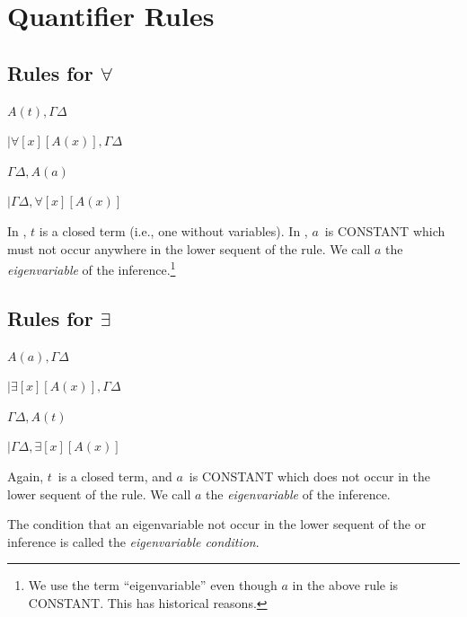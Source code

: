\documentclass[10pt,a4paper]{article}
\newcommand*{\olup}[1]{\MakeUppercase{#1}}
\theoremstyle{plain}
\theoremstyle{definition}
\theoremstyle{remark}
\newcommand*{\olfileid}[3]{}
\newcommand*{\olsection}[1]{\section*{#1}}
\providecommand{\RightLabel}[1]{}
\providecommand{\DisplayProof}{}
\providecommand{\fCenter}{}
\providecommand{\lforall}{\mathord{\forall}}
\providecommand{\lexists}{\mathord{\exists}}
\providecommand{\LeftR}[1]{}
\providecommand{\RightR}[1]{}
\providecommand{\UnaryInf}{\ensuremath{\mid}}
\providecommand{\RightR}{\mathrm{R}}
\providecommand{\LeftR}{\mathrm{L}}
\providecommand{\Axiom}{\mathrm{Ax}}
\begin{document}
\olfileid{fol}{seq}{qrl}

\olsection{Quantifier Rules}

\subsection{Rules for $\lforall$}

\begin{defish}
\Axiom$ A(t), \Gamma \fCenter \Delta$
\RightLabel{\LeftR{\lforall}}
\UnaryInf$ \lforall[x][A(x)],\Gamma \fCenter \Delta$
\DisplayProof
\hfill
\Axiom$ \Gamma \fCenter \Delta, A(a) $
\RightLabel{\RightR{\lforall}}
\UnaryInf$ \Gamma \fCenter \Delta, \lforall[x][A(x)]$
\DisplayProof
\end{defish}

In \LeftR{\lforall}, $t$ is a closed term (i.e., one without
variables). In \RightR{\lforall}, $a$~is \olup{constant} which must not
occur anywhere in the lower sequent of the \RightR{\lforall} rule. We
call $a$ the \emph{eigenvariable} of the \RightR{\forall}
inference.\footnote{We use the term ``eigenvariable'' even though $a$
in the above rule is \olup{constant}. This has historical reasons.}

\subsection{Rules for $\lexists$}

\begin{defish}
\Axiom$ A(a), \Gamma \fCenter \Delta $
\RightLabel{\LeftR{\lexists}}
\UnaryInf$ \lexists[x][A(x)], \Gamma \fCenter \Delta$
\DisplayProof
\hfill
\Axiom$ \Gamma \fCenter \Delta, A(t) $
\RightLabel{\RightR{\lexists}}
\UnaryInf$ \Gamma \fCenter \Delta, \lexists[x][A(x)]$
\DisplayProof
\end{defish}

Again, $t$~is a closed term, and $a$~is \olup{constant} which does not
occur in the lower sequent of the \LeftR{\lexists} rule. We call $a$
the \emph{eigenvariable} of the \LeftR{\lexists} inference.

The condition that an eigenvariable not occur in the lower sequent of
the \RightR{\lforall} or \LeftR{\lexists} inference is called the
\emph{eigenvariable condition}.
\end{document}
